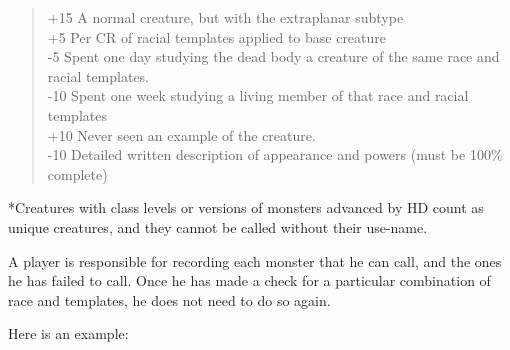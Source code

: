 \begin{quote}
+15 A normal creature, but with the extraplanar subtype\\
+5 Per CR of racial templates applied to base creature\\
-5 Spent one day studying the dead body a creature of the same race and racial templates.\\
-10 Spent one week studying a living member of that race and racial templates\\
+10 Never seen an example of the creature.\\
-10 Detailed written description of appearance and powers (must be 100\% complete)\\
\end{quote}

*Creatures with class levels or versions of monsters advanced by HD count as unique creatures, and they cannot be called without their use-name.

A player is responsible for recording each monster that he can call, and the ones he has failed to call. Once he has made a check for a particular combination of race and templates, he does not need to do so again.

Here is an example:


